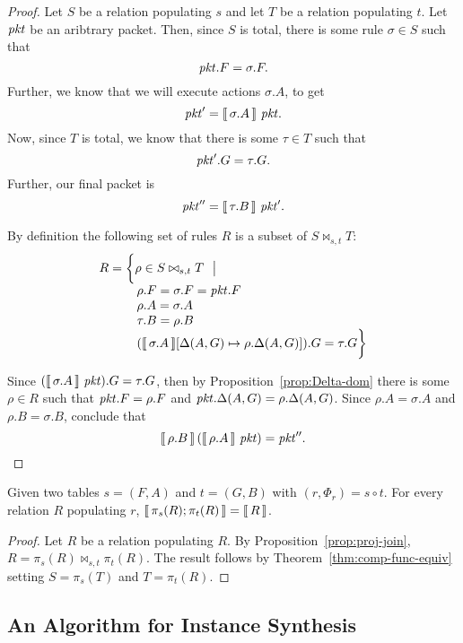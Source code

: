 \begin{proof}
  Let $S$ be a relation populating $s$ and let $T$ be a relation
  populating $t$.
  Let $\mathit{pkt}$ be an aribtrary packet. Then, since $S$ is total, there
  is some rule $\sigma \in S$ such that \[\mathit{pkt}.F = \sigma.F.\] Further, we
  know that we will execute actions $\sigma.A$, to get
  \[\mathit{pkt}' = \llbracket\,\sigma.A\,\rrbracket~\mathit{pkt}.\] Now, since $T$ is total, we know
  that there is some $\tau \in T$ such that \[\mathit{pkt}'.G = \tau.G.\]
  Further, our final packet is \[\mathit{pkt}'' = \llbracket\,\tau.B\,\rrbracket~\mathit{pkt}'.\]

  By definition the following set of rules $R$ is a subset of $S \bowtie_{s,t}T$:
  \[\begin{array}{l}
      R  = \bigg\{\rho \in S \bowtie_{s,t} T~~\big|\\
      \qquad\quad \rho.F = \sigma.F = \mathit{pkt}.F\\
      \qquad\quad \rho.A = \sigma.A \\
      \qquad\quad \tau.B = \rho.B \\
      \qquad\quad (\llbracket\,\sigma.A\,\rrbracket[\Delta(A,G) \mapsto \rho.\Delta(A,G)]).G =\tau.G \bigg\}
    \end{array}\]

  Since $(\llbracket\,\sigma.A\,\rrbracket~\mathit{pkt}).G = \tau.G$, then by
  Proposition~\ref{prop:Delta-dom} there is some $\rho \in R$ such
  that $\mathit{pkt}.F = \rho.F$ and $\mathit{pkt}.\Delta(A,G) =
  \rho.\Delta(A,G)$. Since $\rho.A = \sigma.A$ and
  $\rho.B = \sigma.B$, conclude that
  \[\llbracket\,\rho.B\,\rrbracket\left(\llbracket\,\rho.A\,\rrbracket~\mathit{pkt}\right) = \mathit{pkt}''.\]
\end{proof}


\begin{theorem}
  \label{thm:decomp-func-equiv}
  Given two tables $s = (F,A)$ and $t = (G,B)$ with
  $(r, \Phi_r) = s \circ t$. For every relation $R$ populating $r$, 
  $\llbracket\,\pi_s(R);\pi_t(R)\,\rrbracket = \llbracket\,R\,\rrbracket$.
\end{theorem}

\begin{proof}
  Let $R$ be a relation populating $R$. By
  Proposition~\ref{prop:proj-join},
  $R = \pi_s(R)\bowtie_{s,t}\pi_t(R)$. The result follows by
  Theorem~\ref{thm:comp-func-equiv} setting $S = \pi_s(T)$ and
  $T=\pi_t(R)$.
\end{proof}

\subsection{An Algorithm for Instance Synthesis}

